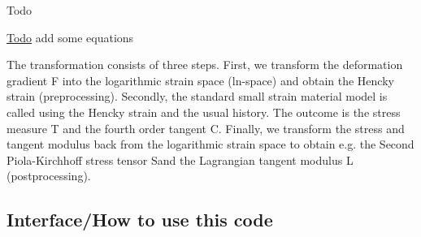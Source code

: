 \begin{DoxyRefDesc}{Todo}
\item[\hyperlink{todo__todo000001}{Todo}]add some equations\end{DoxyRefDesc}


The transformation consists of three steps. First, we transform the deformation gradient {\ttfamily F} into the logarithmic strain space (ln-\/space) and obtain the Hencky strain (preprocessing). Secondly, the standard small strain material model is called using the Hencky strain and the usual history. The outcome is the stress measure {\ttfamily T} and the fourth order tangent {\ttfamily C}. Finally, we transform the stress and tangent modulus back from the logarithmic strain space to obtain e.\+g. the Second Piola-\/\+Kirchhoff stress tensor {\ttfamily S}and the Lagrangian tangent modulus {\ttfamily L} (postprocessing).

\subsection*{Interface/\+How to use this code}


